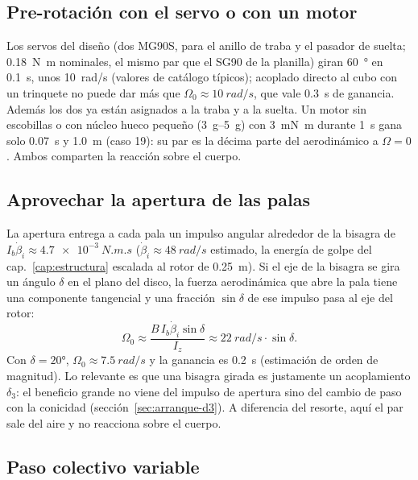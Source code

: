 \subsection{Pre-rotación con el servo o con un motor}

Los servos del diseño (dos MG90S, para el anillo de traba y el pasador de suelta; \SI{0.18}{N.m} nominales, el mismo par que el SG90 de la planilla) giran \SI{60}{\degree} en \SI{0.1}{s}, unos
\SI{10}{rad/s} (valores de catálogo típicos); acoplado directo al cubo con un trinquete no
puede dar más que $\Omega_0\approx\SI{10}{rad/s}$, que vale \SI{0.3}{s} de ganancia. Además
los dos ya están asignados a la traba y a la suelta. Un motor sin escobillas o con núcleo hueco pequeño
(\SIrange{3}{5}{g}) con \SI{3}{mN.m} durante \SI{1}{s} gana solo \SI{0.07}{s} y \SI{1.0}{m}
(caso 19): su par es la décima parte del aerodinámico a $\Omega=0$. Ambos comparten la reacción sobre el
cuerpo.

\subsection{Aprovechar la apertura de las palas}

La apertura entrega a cada pala un impulso angular alrededor de la bisagra de
$I_b\dot\beta_i\approx\SI{4.7e-3}{N.m.s}$ ($\dot\beta_i\approx\SI{48}{rad/s}$ estimado, la
energía de golpe del cap.~\ref{cap:estructura} escalada al rotor de \SI{0.25}{m}). Si el eje de la bisagra se
gira un ángulo $\delta$ en el plano del disco, la fuerza aerodinámica que abre la pala tiene
una componente tangencial y una fracción $\sin\delta$ de ese impulso pasa al eje del rotor:
\begin{equation}
  \Omega_0\approx\frac{B\,I_b\dot\beta_i\sin\delta}{I_z}\approx\SI{22}{rad/s}\cdot\sin\delta .
  \label{eq:arranque-apert}
\end{equation}
Con $\delta=\ang{20}$, $\Omega_0\approx\SI{7.5}{rad/s}$ y la ganancia es \SI{0.2}{s} (estimación
de orden de magnitud). Lo relevante es que una bisagra girada es justamente un acoplamiento
$\delta_3$: el beneficio grande no viene del impulso de apertura sino del cambio de paso con
la conicidad (sección~\ref{sec:arranque-d3}). A diferencia del resorte, aquí el par sale del
aire y no reacciona sobre el cuerpo.

\subsection{Paso colectivo variable}

